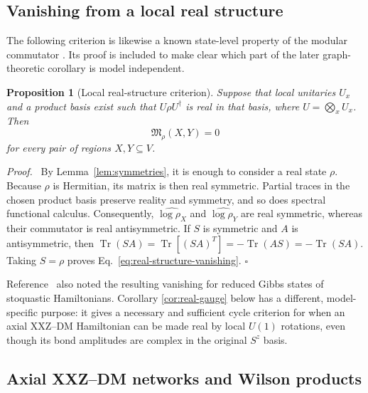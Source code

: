 \documentclass[11pt]{article}
\newcommand{\Tr}{\operatorname{Tr}}
\newcommand{\Mmod}{\mathfrak{M}}
\newtheorem{proposition}[theorem]{Proposition}
\newenvironment{proof}{\par\noindent\textit{Proof.}\ }%
{\unskip\nobreak\hfill\(\square\)\par}
\begin{document}
\subsection{Vanishing from a local real structure}

The following criterion is likewise a known state-level property of the
modular commutator \cite{KimEtAl2022PRB}.  Its proof is included to make clear
which part of the later graph-theoretic corollary is model independent.

\begin{proposition}[Local real-structure criterion]
\label{prop:real-structure}
Suppose that local unitaries $U_x$ and a product basis exist such that
$U\rho U^\dagger$ is real in that basis, where $U=\bigotimes_xU_x$.  Then
\begin{equation}
 \Mmod_\rho(X,Y)=0
 \label{eq:real-structure-vanishing}
\end{equation}
for every pair of regions $X,Y\subseteq V$.
\end{proposition}

\begin{proof}
By Lemma~\ref{lem:symmetries}, it is enough to consider a real state $\rho$.
Because $\rho$ is Hermitian, its matrix is then real symmetric.  Partial
traces in the chosen product basis preserve reality and symmetry, and so does
spectral functional calculus.  Consequently,
$\widehat{\log\rho_X}$ and $\widehat{\log\rho_Y}$ are real symmetric,
whereas their commutator is real antisymmetric.  If $S$ is symmetric and $A$
is antisymmetric, then
\(
\Tr(SA)=\Tr[(SA)^T]=-\Tr(AS)=-\Tr(SA)
\).
Taking $S=\rho$ proves Eq.~\eqref{eq:real-structure-vanishing}.
\end{proof}

Reference~\cite{KimEtAl2022PRB} also noted the resulting vanishing for
reduced Gibbs states of stoquastic Hamiltonians.  Corollary
\ref{cor:real-gauge} below has a different, model-specific purpose: it gives
a necessary and sufficient cycle criterion for when an axial XXZ--DM
Hamiltonian can be made real by local $U(1)$ rotations, even though its bond
amplitudes are complex in the original $S^z$ basis.

\subsection{Axial XXZ--DM networks and Wilson products}
\label{sec:axial}
\end{document}
